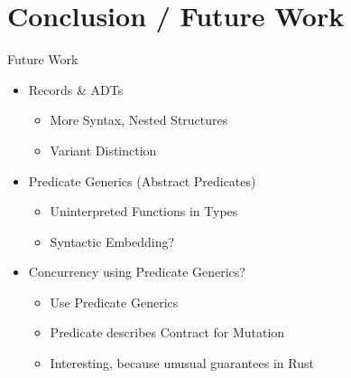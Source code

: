 \documentclass{sdqbeamer}
\begin{document}
\section{Conclusion / Future Work}


\begin{frame}{Future Work}
  \begin{itemize}
    \item Records \& ADTs 
    \begin{itemize}
      \item More Syntax, Nested Structures
      \item Variant Distinction
    \end{itemize}
    \item Predicate Generics (Abstract Predicates)
      \begin{itemize}
        \item Uninterpreted Functions in Types
        \item Syntactic Embedding?
      \end{itemize}
    \item Concurrency using Predicate Generics?
      \begin{itemize}
        \item Use Predicate Generics
        \item Predicate describes Contract for Mutation
        \item Interesting, because unusual guarantees in Rust
      \end{itemize}
  \end{itemize}
\end{frame}
\end{document}
